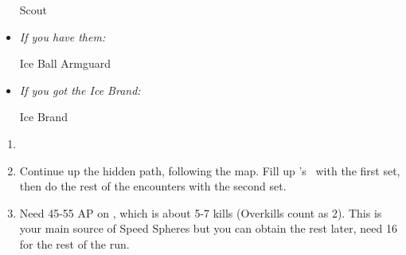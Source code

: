 \begin{equip}
	\begin{itemize}
		\wakkaf Scout
		\item \textit{If you have them:}
		      \begin{itemize}
			      \wakkaf Ice Ball
			      \wakkaf Armguard
		      \end{itemize}
		\item \textit{If you got the Ice Brand:}
		      \begin{itemize}
			      \tidusf Ice Brand
		      \end{itemize}
	\end{itemize}
\end{equip}
\begin{enumerate}[resume]
	\item \formation{\tidus}{\yuna}{\wakka}
	\item Continue up the hidden path, following the map. Fill up \valefor's \od\ with the first set, then do the rest of the encounters with the second set.
	\item Need 45-55 AP on \tidus, which is about 5-7 kills (Overkills count as 2). This is your main source of Speed Spheres but you can obtain the rest later, need 16 for the rest of the run.
\end{enumerate}
\bothvfill\winvfill\lossvfill
